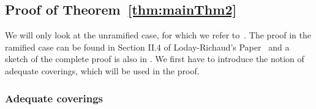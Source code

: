 \subsection{Proof of Theorem~\ref{thm:mainThm2}}\label{sec:proofOfMatrixThm}
We will only look at the unramified case, for which we refer
to~\cite[Sec.II.3]{Loday1994}.
The proof in the ramified case can be found in Section II.4 of Loday-Richaud's
Paper~\cite{Loday1994} and a sketch of the complete proof is also in
\cite{Loday2004}.
We first have to introduce the notion of adequate coverings, which will be used
in the proof.

\subsubsection{Adequate coverings}
\begin{comment}
  \begin{enumerate}
  \item \cite[371]{Martinet1991} defines adapted coverings
  \item \cite[5269]{Loday2004} defines acyclic coverings
    \begin{itemize}
    \item uses the \textbf{theorem of Leray}
      \url{https://de.wikipedia.org/wiki/Satz_von_Leray}
    \end{itemize}
  \end{enumerate}
\end{comment}
